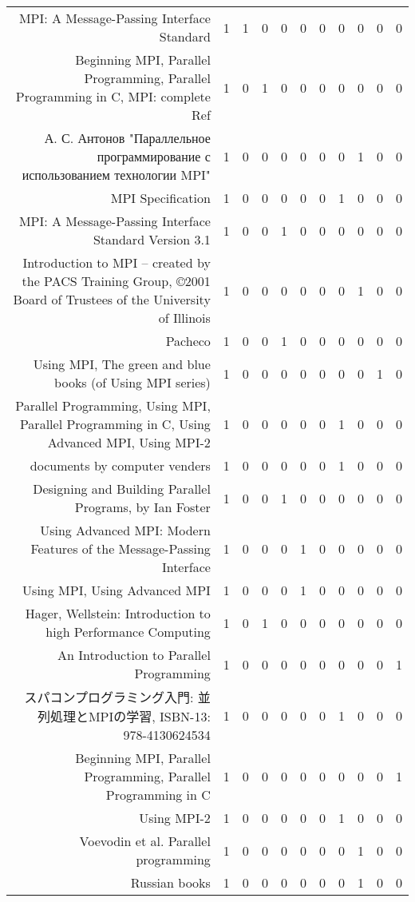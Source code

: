 {\begin{landscape}
\begin{longtable}[htb]{r|c|c|c|c|c|c|c|c|c|c}
{MPI: A Message-Passing Interface Standard} & 1 & 1 & 0 & 0 & 0 & 0 & 0 & 0 & 0 & 0 \\%
{Beginning MPI, Parallel Programming, Parallel Programming in C, MPI: complete Ref} & 1 & 0 & 1 & 0 & 0 & 0 & 0 & 0 & 0 & 0 \\%
{А. С. Антонов "Параллельное программирование с использованием технологии MPI"} & 1 & 0 & 0 & 0 & 0 & 0 & 0 & 1 & 0 & 0 \\%
{MPI Specification} & 1 & 0 & 0 & 0 & 0 & 0 & 1 & 0 & 0 & 0 \\%
{MPI: A Message-Passing Interface Standard Version 3.1} & 1 & 0 & 0 & 1 & 0 & 0 & 0 & 0 & 0 & 0 \\%
{Introduction to MPI – created by the PACS Training Group, ©2001 Board of Trustees of the University of Illinois} & 1 & 0 & 0 & 0 & 0 & 0 & 0 & 1 & 0 & 0 \\%
{Pacheco} & 1 & 0 & 0 & 1 & 0 & 0 & 0 & 0 & 0 & 0 \\%
{Using MPI, The green and blue books (of Using MPI series)} & 1 & 0 & 0 & 0 & 0 & 0 & 0 & 0 & 1 & 0 \\%
{Parallel Programming, Using MPI, Parallel Programming in C, Using Advanced MPI, Using MPI-2} & 1 & 0 & 0 & 0 & 0 & 0 & 1 & 0 & 0 & 0 \\%
{documents by computer venders} & 1 & 0 & 0 & 0 & 0 & 0 & 1 & 0 & 0 & 0 \\%
{Designing and Building Parallel Programs, by Ian Foster} & 1 & 0 & 0 & 1 & 0 & 0 & 0 & 0 & 0 & 0 \\%
{Using Advanced MPI: Modern Features of the Message-Passing Interface} & 1 & 0 & 0 & 0 & 1 & 0 & 0 & 0 & 0 & 0 \\%
{Using MPI, Using Advanced MPI} & 1 & 0 & 0 & 0 & 1 & 0 & 0 & 0 & 0 & 0 \\%
{Hager, Wellstein: Introduction to high Performance Computing} & 1 & 0 & 1 & 0 & 0 & 0 & 0 & 0 & 0 & 0 \\%
{An Introduction to Parallel Programming} & 1 & 0 & 0 & 0 & 0 & 0 & 0 & 0 & 0 & 1 \\%
{スパコンプログラミング入門: 並列処理とMPIの学習, ISBN-13: 978-4130624534} & 1 & 0 & 0 & 0 & 0 & 0 & 1 & 0 & 0 & 0 \\%
{Beginning MPI, Parallel Programming, Parallel Programming in C} & 1 & 0 & 0 & 0 & 0 & 0 & 0 & 0 & 0 & 1 \\%
{Using MPI-2} & 1 & 0 & 0 & 0 & 0 & 0 & 1 & 0 & 0 & 0 \\%
{Voevodin et al. Parallel programming} & 1 & 0 & 0 & 0 & 0 & 0 & 0 & 1 & 0 & 0 \\%
{Russian books} & 1 & 0 & 0 & 0 & 0 & 0 & 0 & 1 & 0 & 0 \\%
\hline%
\end{longtable}%
\end{landscape}}%
\clearpage%
